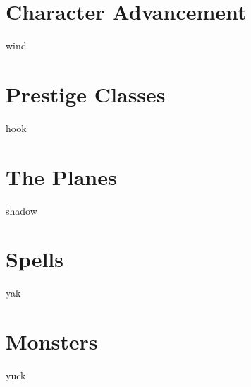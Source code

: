\documentclass[12pt,twoside,onecolumn,openany,final]{memoir}
\begin{document}
\chapter{Character Advancement}
wind
\chapter{Prestige Classes}
hook



\chapter{The Planes}
shadow


\appendix
\appendixpage

\makeatletter
\renewcommand{\@makechapterhead}[1]{%
\vspace*{0 pt}{
\raggedright \normalfont \fontsize{32}{32} \selectfont \bfseries
\ifnum \value{secnumdepth}>-1
  \if@mainmatter \vspace{-8pt} {\fontsize{20}{20} \selectfont Appendix \thechapter:}\\[8pt]
  \fi%
\fi
\hspace{0.65cm} #1\par\nobreak\vspace{20 pt}
}}
\makeatother

\clearpage


\chapter{Spells}
yak
\chapter{Monsters}
yuck




\clearpage
{}
\listoftables

\clearpage
{}
\printindex
\end{document}
